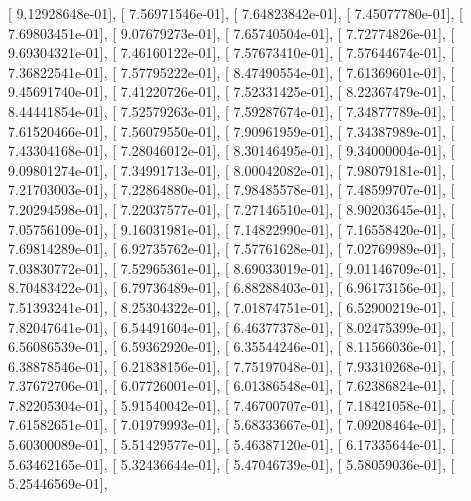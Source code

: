 \documentclass{article}
\begin{document}
       [  9.12928648e-01],
       [  7.56971546e-01],
       [  7.64823842e-01],
       [  7.45077780e-01],
       [  7.69803451e-01],
       [  9.07679273e-01],
       [  7.65740504e-01],
       [  7.72774826e-01],
       [  9.69304321e-01],
       [  7.46160122e-01],
       [  7.57673410e-01],
       [  7.57644674e-01],
       [  7.36822541e-01],
       [  7.57795222e-01],
       [  8.47490554e-01],
       [  7.61369601e-01],
       [  9.45691740e-01],
       [  7.41220726e-01],
       [  7.52331425e-01],
       [  8.22367479e-01],
       [  8.44441854e-01],
       [  7.52579263e-01],
       [  7.59287674e-01],
       [  7.34877789e-01],
       [  7.61520466e-01],
       [  7.56079550e-01],
       [  7.90961959e-01],
       [  7.34387989e-01],
       [  7.43304168e-01],
       [  7.28046012e-01],
       [  8.30146495e-01],
       [  9.34000004e-01],
       [  9.09801274e-01],
       [  7.34991713e-01],
       [  8.00042082e-01],
       [  7.98079181e-01],
       [  7.21703003e-01],
       [  7.22864880e-01],
       [  7.98485578e-01],
       [  7.48599707e-01],
       [  7.20294598e-01],
       [  7.22037577e-01],
       [  7.27146510e-01],
       [  8.90203645e-01],
       [  7.05756109e-01],
       [  9.16031981e-01],
       [  7.14822990e-01],
       [  7.16558420e-01],
       [  7.69814289e-01],
       [  6.92735762e-01],
       [  7.57761628e-01],
       [  7.02769989e-01],
       [  7.03830772e-01],
       [  7.52965361e-01],
       [  8.69033019e-01],
       [  9.01146709e-01],
       [  8.70483422e-01],
       [  6.79736489e-01],
       [  6.88288403e-01],
       [  6.96173156e-01],
       [  7.51393241e-01],
       [  8.25304322e-01],
       [  7.01874751e-01],
       [  6.52900219e-01],
       [  7.82047641e-01],
       [  6.54491604e-01],
       [  6.46377378e-01],
       [  8.02475399e-01],
       [  6.56086539e-01],
       [  6.59362920e-01],
       [  6.35544246e-01],
       [  8.11566036e-01],
       [  6.38878546e-01],
       [  6.21838156e-01],
       [  7.75197048e-01],
       [  7.93310268e-01],
       [  7.37672706e-01],
       [  6.07726001e-01],
       [  6.01386548e-01],
       [  7.62386824e-01],
       [  7.82205304e-01],
       [  5.91540042e-01],
       [  7.46700707e-01],
       [  7.18421058e-01],
       [  7.61582651e-01],
       [  7.01979993e-01],
       [  5.68333667e-01],
       [  7.09208464e-01],
       [  5.60300089e-01],
       [  5.51429577e-01],
       [  5.46387120e-01],
       [  6.17335644e-01],
       [  5.63462165e-01],
       [  5.32436644e-01],
       [  5.47046739e-01],
       [  5.58059036e-01],
       [  5.25446569e-01],
\end{document}
